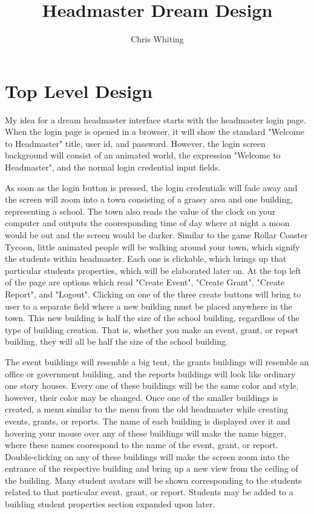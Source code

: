 \documentclass[11pt]{article}
\title{Headmaster Dream Design}
\author{Chris Whiting}
\begin{document}
\maketitle

 
\section{Top Level Design}
My idea for a dream headmaster interface starts with the headmaster login page. When the login page is opened in a browser, it will show the standard "Welcome to Headmaster" title, user id, and password. However, the login screen background will consist of an animated world, the expression "Welcome to Headmaster", and the normal login credential input fields.

As soon as the login button is pressed, the login credentials will fade away and the screen will zoom into a town consisting of a grassy area and one building, representing a school. The town also reads the value of the clock on your computer and outputs the cooresponding time of day where at night a moon would be out and the screen would be darker. Similar to the game Rollar Coaster Tycoon, little animated people will be walking around your town, which signify the students within headmaster. Each one is clickable, which brings up that particular students properties, which will be elaborated later on. At the top left of the page are options which read "Create Event", "Create Grant", "Create Report", and "Logout". Clicking on one of the three create buttons will bring to user to a separate field where a new building must be placed anywhere in the town. This new building is half the size of the school building, regardless of the type of building creation. That is, whether you make an event, grant, or report building, they will all be half the size of the school building. 

The event buildings will resemble a big tent, the grants buildings will resemble an office or government building, and the reports buildings will look like ordinary one story houses. Every one of these buildings will be the same color and style, however, their color may be changed. Once one of the smaller buildings is created, a menu similar to the menu from the old headmaster while creating events, grants, or reports. The name of each building is displayed over it and hovering your mouse over any of these buildings will make the name bigger, where these names coorespond to the name of the event, grant, or report. Double-clicking on any of these buildings will make the screen zoom into the entrance of the respective building and bring up a new view from the ceiling of the building. Many student avatars will be shown corresponding to the students related to that particular event, grant, or report. Students may be added to a building student properties section expanded upon later.
\end{document}
